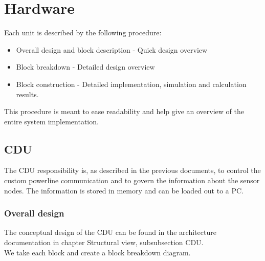 \chapter{Hardware}
Each unit is described by the following procedure:
\begin{itemize}
\item Overall design and block description - Quick design overview
\item Block breakdown - Detailed design overview
\item Block construction - Detailed implementation, simulation and calculation results.
\end{itemize}
This procedure is meant to ease readability and help give an overview of the entire system implementation.
\section{CDU}
The CDU responsibility is, as described in the previous documents, to control the custom powerline communication and to govern the information about the sensor nodes. The information is stored in memory and can be loaded out to a PC.
\subsection{Overall design}
The conceptual design of the CDU can be found in the architecture documentation in chapter Structural view, subsubsection CDU.\\
We take each block and create a block breakdown diagram.\\

